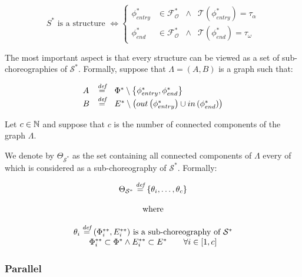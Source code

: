 \begin{equation}
	S^* \text{ is a structure } \Leftrightarrow \left\{ \begin{array}{rlll}
		\phi_{entry}^* & \in \mathscr{F_O^*} & \wedge & \mathscr{T}(\phi_{entry}^*) = \tau_{\alpha} \\ 
		\phi_{end}^* & \in \mathscr{F_O^*} & \wedge & \mathscr{T}(\phi_{end}^*) = \tau_{\omega}
	\end{array} \right.
\end{equation}

The most important aspect is that every structure can be viewed as a set of sub-choreographies of $\mathcal{S}^*$. Formally, suppose that $\Lambda = (A,B)$ is a graph such that:

\begin{equation}
\begin{array}{lll}
	A & \overset{\textit{def}}{=} & \Phi^* \setminus \left\lbrace \phi_{entry}^*,\phi_{end}^* \right\rbrace   \\
	B & \overset{\textit{def}}{=} & E^* \setminus \left( out\left(\phi_{entry}^*\right) \cup in\left(\phi_{end}^*\right) \right)
\end{array}
\end{equation}

Let $c \in \mathbb{N}$ and suppose that $c$ is the number of connected components of the graph $\Lambda$.

We denote by $\Theta_{\mathcal{S}^*}$ as the set containing all connected components of $\Lambda$ every of which is considered as a sub-choreography of $\mathcal{S}^*$. Formally:

\begin{equation}
	\begin{array}{c}
		\Theta_{\mathcal{S}^*} \overset{\textit{def}}{=} \left\lbrace \theta_i, \ldots ,\theta_c \right\rbrace \\\\
		\text{ where } \\\\
		
		\theta_i \overset{\textit{def}}{=} (\Phi^{**}_i, E^{**}_i) \text{ is a sub-choreography of } \mathcal{S}^* \\
		 \Phi^{**}_i \subset \Phi^{*} \wedge E^{**}_i \subset E^{*} \qquad \forall i \in \left[ 1, c \right] \\
	\end{array}
\end{equation} 

\subsubsection{Parallel}

